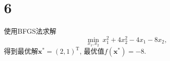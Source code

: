 \section*{6}

使用BFGS法求解
\begin{equation*}
    \min_{x_1,x_2} ~ x_1^2+4x_2^2-4x_1-8x_2,
\end{equation*}
得到最优解$\bm{x}^*=(2,1)^\mathrm{T}$, 最优值$f(\bm{x}^*)=-8$.
